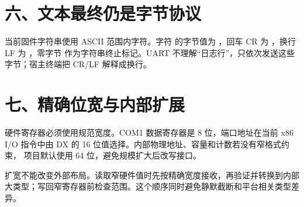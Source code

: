 \section{六、文本最终仍是字节协议}

当前固件字符串使用 ASCII 范围内字符。字符  的字节值为
，回车 CR 为 ，换行 LF 为 ，零字节
 作为字符串终止标记。UART 不理解“日志行”，只依次发送这些
字节；宿主终端把 CR/LF 解释成换行。

\section{七、精确位宽与内部扩展}

硬件寄存器必须使用规范宽度。COM1 数据寄存器是 8 位，端口地址在当前 x86
I/O 指令中由 DX 的 16 位值选择。内部物理地址、容量和计数若没有窄格式约束，
项目默认使用 64 位，避免规模扩大后改写接口。

扩宽不能改变外部布局。读取窄硬件值时先按精确宽度接收，再验证并转换到内部
大类型；写回窄寄存器前检查范围。这个顺序同时避免静默截断和平台相关类型差异。
